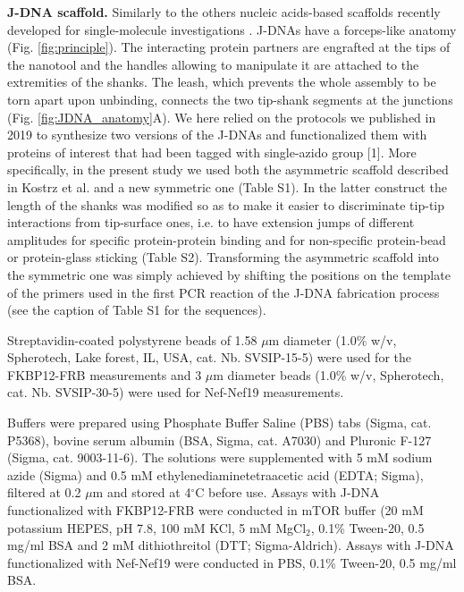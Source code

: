 \documentclass{biophys-new}
\begin{document}
\noindent
\textbf{J-DNA scaffold.} Similarly to the others nucleic acids-based scaffolds recently developed for single-molecule investigations \cite{kostrz2019, yang2016,halvorsen2011, penth2021, li2019, ma2019, mickolajczyk2022, shrestha2021, kilchherr2016}. J-DNAs have a forceps-like anatomy \cite{gosse2019} (Fig. \ref{fig:principle}). The interacting protein partners are engrafted at the tips of the nanotool and the handles allowing to manipulate it are attached to the extremities of the shanks. The leash, which prevents the whole assembly to be torn apart upon unbinding, connects the two tip-shank segments at the junctions (Fig. \ref{fig:JDNA_anatomy}A). We here relied on the protocols we published in 2019 to synthesize two versions of the J-DNAs and functionalized them with proteins of interest that had been tagged with single-azido group [1]. More specifically, in the present study we used both the asymmetric scaffold described in Kostrz et al.  \cite{kostrz2019} and a new symmetric one (Table S1). In the latter construct the length of the shanks was modified so as to make it easier to discriminate tip-tip interactions from tip-surface ones, i.e. to have extension jumps of different amplitudes for specific protein-protein binding and for non-specific protein-bead or protein-glass sticking (Table S2). Transforming the asymmetric scaffold into the symmetric one was simply achieved by shifting the positions on the template of the primers used in the first PCR reaction of the J-DNA fabrication process (see the caption of Table S1 for the sequences). 

Streptavidin-coated polystyrene beads of 1.58 $\mu$m diameter (1.0\% w/v, Spherotech,  Lake forest, IL, USA, cat. Nb. SVSIP-15-5) were used for the FKBP12-FRB measurements and 3 $\mu$m diameter beads (1.0\% w/v, Spherotech, cat. Nb. SVSIP-30-5) were used for Nef-Nef19 measurements.%

Buffers were prepared using Phosphate Buffer Saline (PBS) tabs (Sigma, cat. P5368), bovine serum albumin (BSA, Sigma, cat. A7030) and Pluronic F-127 (Sigma, cat. 9003-11-6). The solutions were supplemented with 5 mM sodium azide (Sigma) and 0.5  mM  ethylenediaminetetraacetic acid (EDTA;  Sigma), filtered at 0.2 $\mu$m and stored at 4$^{\circ}$C before use.
Assays with J-DNA functionalized with FKBP12-FRB were conducted in mTOR buffer (20 mM potassium HEPES, pH 7.8, 100 mM KCl, 5 mM MgCl$_2$, 0.1\% Tween-20, 0.5 mg/ml BSA and 2 mM dithiothreitol (DTT; Sigma-Aldrich).
Assays with J-DNA functionalized with Nef-Nef19 were conducted in PBS, 0.1\% Tween-20, 0.5 mg/ml BSA.
\end{document}
